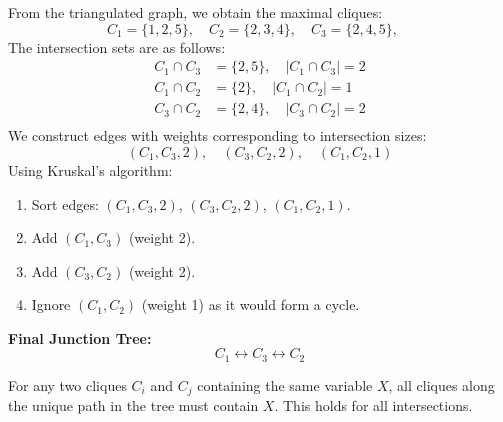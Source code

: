 \documentclass[a4paper,12pt]{article}
\begin{document}
\begin{center}
\end{center}
From the triangulated graph, we obtain the maximal cliques:
\[
C_1 = \{1,2,5\}, \quad
C_2 = \{2,3,4\}, \quad
C_3 = \{2,4,5\}, \quad
\]
The intersection sets are as follows: 
\begin{align*}
C_1 \cap C_3 &= \{2,5\}, \quad |C_1 \cap C_3| = 2 \\
C_1 \cap C_2 &= \{2\}, \quad |C_1 \cap C_2| = 1 \\
C_3 \cap C_2 &= \{2,4\}, \quad |C_3 \cap C_2| = 2 \\
\end{align*}
We construct edges with weights corresponding to intersection sizes:
\[
(C_1, C_3, 2), \quad (C_3, C_2, 2), \quad (C_1, C_2, 1)
\]
Using Kruskal’s algorithm:
\begin{enumerate}
    \item Sort edges: $(C_1, C_3, 2)$, $(C_3, C_2, 2)$, $(C_1, C_2, 1)$.
    \item Add $(C_1, C_3)$ (weight 2).
    \item Add $(C_3, C_2)$ (weight 2).
    \item Ignore $(C_1, C_2)$ (weight 1) as it would form a cycle.
\end{enumerate}
\textbf{Final Junction Tree:}
\[
C_1 \leftrightarrow C_3 \leftrightarrow C_2
\]
\begin{center}
\end{center}
For any two cliques $C_i$ and $C_j$ containing the same variable $X$, all cliques along the unique path in the tree must contain $X$. This holds for all intersections.
\end{document}
